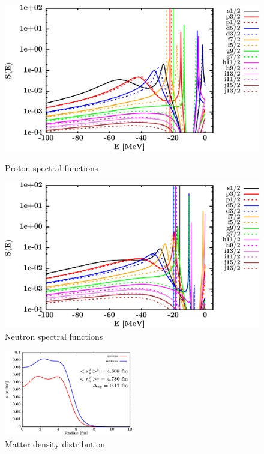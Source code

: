 \begin{figure}[H]
    \centering
    \begin{minipage}{0.45\textwidth}
        \centering
        \includegraphics[width=1.0\textwidth]{figures/sn124_protonSpectralFunctions.png}
        \caption{Proton spectral functions}
        \label{DOMFitData_sn124_proton_spectralFunctions}
    \end{minipage}\hfill
    \begin{minipage}{0.45\textwidth}
        \centering
        \includegraphics[width=1.0\textwidth]{figures/sn124_neutronSpectralFunctions.png}
        \caption{Neutron spectral functions}
        \label{DOMFitData_sn124_neutron_spectralFunctions}
    \end{minipage}
\end{figure}

\begin{figure}[H]
    \centering
    \includegraphics[width = 0.5\textwidth]{figures/sn124_matterDensity.png}
    \caption{Matter density distribution}
    \label{DOMFitData_sn124_matterDensity}
\end{figure}

